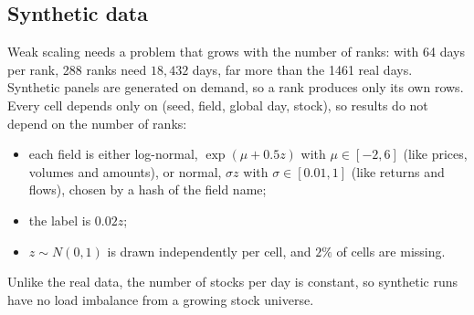 \documentclass[11pt,a4paper]{article}
\begin{document}
\subsection{Synthetic data}
Weak scaling needs a problem that grows with the number of ranks: with 64 days per rank, 288 ranks need $18{,}432$ days, far more than the 1461 real days. Synthetic panels are generated on demand, so a rank produces only its own rows. Every cell depends only on (seed, field, global day, stock), so results do not depend on the number of ranks:
\begin{itemize}[nosep]
  \item each field is either log-normal, $\exp(\mu + 0.5z)$ with $\mu\in[-2,6]$ (like prices, volumes and amounts), or normal, $\sigma z$ with $\sigma\in[0.01,1]$ (like returns and flows), chosen by a hash of the field name;
  \item the label is $0.02z$;
  \item $z\sim N(0,1)$ is drawn independently per cell, and $2\%$ of cells are missing.
\end{itemize}
Unlike the real data, the number of stocks per day is constant, so synthetic runs have no load imbalance from a growing stock universe.

\end{document}

